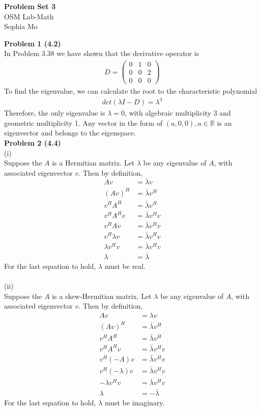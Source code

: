 \documentclass[letterpaper,12pt]{article}
\theoremstyle{definition}
\begin{document}
\begin{flushleft}
  \textbf{\large{Problem Set} 3} \\
  OSM Lab-Math \\
  Sophia Mo
\end{flushleft}

\vspace{5mm}

\noindent\textbf{Problem 1 (4.2)} \\
In Problem 3.38 we have shown that the derivative operator is
\begin{align*}
D =
\begin{pmatrix}
0&1&0\\
0&0&2\\
0&0&0
\end{pmatrix}
\end{align*}
To find the eigenvalue, we can calculate the root to the characteristic polynomial 
\begin{align*}
det(\lambda I - D) = \lambda^3
\end{align*}
Therefore, the only eigenvalue is $\lambda = 0$, with algebraic multiplicity 3 and geometric multiplicity 1. Any vector in the form of $(a, 0, 0), a\in \mathbb{R}$ is an eigenvector and belongs to the eigenspace.\\

\noindent\textbf{Problem 2 (4.4)} \\
(i)\\
Suppose the $A$ is a Hermitian matrix. Let $\lambda$ be any eigenvalue of $A$, with associated eigenvector $v$. Then by definition,
\begin{align*}
Av &= \lambda v\\
(Av)^H &= \bar{\lambda} v^H\\
v^H A^H &= \bar{\lambda} v^H\\
v^HA^Hv &= \bar{\lambda}v^Hv \\
v^H A v &= \bar{\lambda}v^H v\\
v^H \lambda v &=\bar{\lambda} v^H v\\
\lambda v^H v &= \bar{\lambda} v^H v\\
\lambda & = \bar{\lambda}
\end{align*}
For the last equation to hold, $\lambda$ must be real.\\
\\
(ii)\\
Suppose the $A$ is a skew-Hermitian matrix. Let $\lambda$ be any eigenvalue of $A$, with associated eigenvector $v$. Then by definition,
\begin{align*}
Av &= \lambda v\\
(Av)^H &= \bar{\lambda} v^H\\
v^H A^H &= \bar{\lambda} v^H\\
v^HA^Hv &= \bar{\lambda}v^Hv \\
v^H (-A) v &= \bar{\lambda}v^H v\\
v^H (-\lambda) v &=\bar{\lambda} v^H v\\
-\lambda v^H v &= \bar{\lambda} v^H v\\
\lambda & = -\bar{\lambda}
\end{align*}
For the last equation to hold, $\lambda$ must be imaginary.\\
\end{document}

